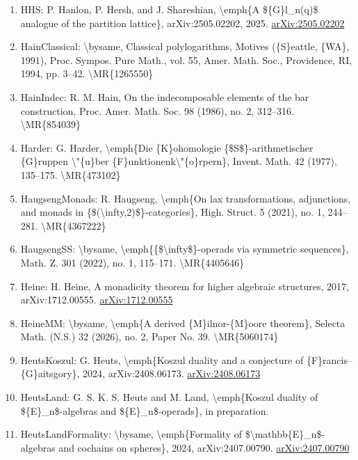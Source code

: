 \documentclass[11pt]{article}
\begin{document}
\begin{enumerate}[leftmargin=*]
  \item HHS: P. Hanlon, P. Hersh, and J. Shareshian, \textbackslash{}emph\{A \$\{G\}l\_n(q)\$ analogue of the partition lattice\}, arXiv:2505.02202, 2025. \href{https://arxiv.org/abs/2505.02202}{arXiv:2505.02202}
  \item HainClassical: \textbackslash{}bysame, Classical polylogarithms, Motives (\{S\}eattle, \{WA\}, 1991), Proc. Sympos. Pure Math., vol. 55, Amer. Math. Soc., Providence, RI, 1994, pp. 3--42. \textbackslash{}MR\{1265550\}
  \item HainIndec: R. M. Hain, On the indecomposable elements of the bar construction, Proc. Amer. Math. Soc. 98 (1986), no. 2, 312--316. \textbackslash{}MR\{854039\}
  \item Harder: G. Harder, \textbackslash{}emph\{Die \{K\}ohomologie \{\$S\$\}-arithmetischer \{G\}ruppen \textbackslash{}"\{u\}ber \{F\}unktionenk\textbackslash{}"\{o\}rpern\}, Invent. Math. 42 (1977), 135--175. \textbackslash{}MR\{473102\}
  \item HaugsengMonads: R. Haugseng, \textbackslash{}emph\{On lax transformations, adjunctions, and monads in \{\$(\textbackslash{}infty,2)\$\}-categories\}, High. Struct. 5 (2021), no. 1, 244--281. \textbackslash{}MR\{4367222\}
  \item HaugsengSS: \textbackslash{}bysame, \textbackslash{}emph\{\{\$\textbackslash{}infty\$\}-operads via symmetric sequences\}, Math. Z. 301 (2022), no. 1, 115--171. \textbackslash{}MR\{4405646\}
  \item Heine: H. Heine, A monadicity theorem for higher algebraic structures, 2017, arXiv:1712.00555. \href{https://arxiv.org/abs/1712.00555}{arXiv:1712.00555}
  \item HeineMM: \textbackslash{}bysame, \textbackslash{}emph\{A derived \{M\}ilnor-\{M\}oore theorem\}, Selecta Math. (N.S.) 32 (2026), no. 2, Paper No. 39. \textbackslash{}MR\{5060174\}
  \item HeutsKoszul: G. Heuts, \textbackslash{}emph\{Koszul duality and a conjecture of \{F\}rancis--\{G\}aitsgory\}, 2024, arXiv:2408.06173. \href{https://arxiv.org/abs/2408.06173}{arXiv:2408.06173}
  \item HeutsLand: G. S. K. S. Heuts and M. Land, \textbackslash{}emph\{Koszul duality of \$\{E\}\_n\$-algebras and \$\{E\}\_n\$-operads\}, in preparation.
  \item HeutsLandFormality: \textbackslash{}bysame, \textbackslash{}emph\{Formality of \$\textbackslash{}mathbb\{E\}\_n\$-algebras and cochains on spheres\}, 2024, arXiv:2407.00790. \href{https://arxiv.org/abs/2407.00790}{arXiv:2407.00790}

\end{enumerate}
\end{document}
